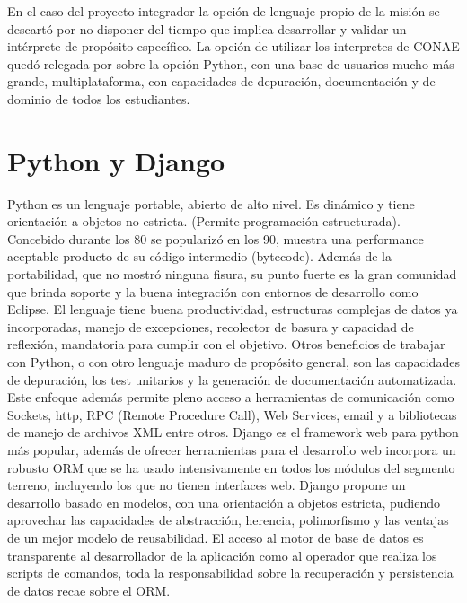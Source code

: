 \documentclass[twoside,twocolumn]{article}
\begin{document}
En el caso del proyecto integrador la opción de lenguaje propio de la misión se descartó por no disponer del tiempo que implica desarrollar y validar un intérprete de propósito específico. La opción de utilizar los interpretes de CONAE quedó relegada por sobre la opción Python, con una base de usuarios mucho más grande, multiplataforma, con capacidades de depuración, documentación y de dominio de todos los estudiantes. 



\section{Python y Django}

Python es un lenguaje portable, abierto de alto nivel. Es dinámico y tiene orientación a objetos no estricta. (Permite programación estructurada). Concebido durante los 80 se popularizó en los 90, muestra una performance aceptable producto de su código intermedio (bytecode). Además de la portabilidad, que no mostró ninguna fisura, su punto fuerte es la gran comunidad que brinda soporte y la buena integración con entornos de desarrollo como Eclipse.  El lenguaje tiene buena productividad, estructuras complejas de datos ya incorporadas, manejo de excepciones, recolector de basura y capacidad de reflexión, mandatoria para cumplir con el objetivo. Otros beneficios de trabajar con Python, o con otro lenguaje maduro de propósito general, son las capacidades de depuración, los test unitarios y la generación de documentación automatizada. Este enfoque además permite pleno acceso a herramientas de comunicación como Sockets, http, RPC (Remote Procedure Call), Web Services, email y a bibliotecas de manejo de archivos XML entre otros. 
Django es el framework web para python más popular, además de ofrecer herramientas para el desarrollo web incorpora un robusto ORM que se ha usado intensivamente en todos los módulos del segmento terreno, incluyendo los que no tienen interfaces web. Django propone un desarrollo basado en modelos, con una orientación a objetos estricta, pudiendo aprovechar las capacidades de abstracción, herencia, polimorfismo y las ventajas de un mejor modelo de reusabilidad. El acceso al motor de base de datos es transparente al desarrollador de la aplicación como al operador que realiza los scripts de comandos, toda la responsabilidad sobre la recuperación y persistencia de datos recae sobre el ORM.  

\end{document}
